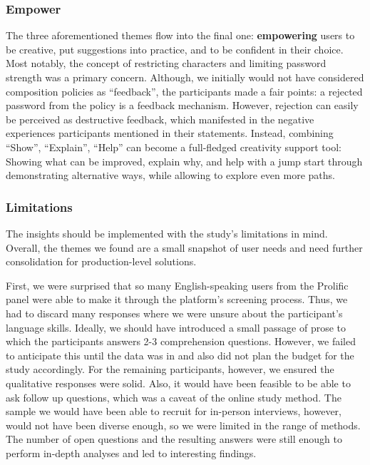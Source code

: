 \subsubsection{Empower}
The three aforementioned themes flow into the final one: \textbf{empowering} users to be creative, put suggestions into practice, and to be confident in their choice. Most notably, the concept of restricting characters and limiting password strength was a primary concern. Although, we initially would not have considered composition policies as ``feedback'', the participants made a fair points: a rejected password from the policy is a feedback mechanism. However, rejection can easily be perceived as destructive feedback, which manifested in the negative experiences participants mentioned in their statements. Instead, combining ``Show'', ``Explain'', ``Help'' can become a full-fledged creativity support tool: Showing what can be improved, explain why, and help with a jump start through demonstrating alternative ways, while allowing to explore even more paths. 




\subsubsection{Limitations}
The insights should be implemented with the study's limitations in mind. Overall, the themes we found are a small snapshot of user needs and need further consolidation for production-level solutions. 

First, we were surprised that so many English-speaking users from the Prolific panel were able to make it through the platform's screening process. Thus, we had to discard many responses where we were unsure about the participant's language skills. Ideally, we should have introduced a small passage of prose to which the participants answers 2-3 comprehension questions. However, we failed to anticipate this until the data was in and also did not plan the budget for the study accordingly. For the remaining participants, however, we ensured the qualitative responses were solid. 
Also, it would have been feasible to be able to ask follow up questions, which was a caveat of the online study method. The sample we would have been able to recruit for in-person interviews, however, would not have been diverse enough, so we were limited in the range of methods. The number of open questions and the resulting answers were still enough to perform in-depth analyses and led to interesting findings. %

